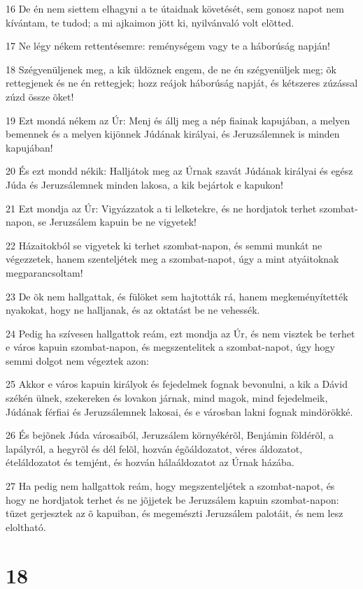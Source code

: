 \par 16 De én nem siettem elhagyni a te útaidnak követését, sem gonosz napot nem kívántam, te tudod; a mi ajkaimon jött ki, nyilvánvaló volt elõtted.
\par 17 Ne légy nékem rettentésemre: reménységem vagy te a háborúság napján!
\par 18 Szégyenüljenek meg, a kik üldöznek engem, de ne én szégyenüljek meg; õk rettegjenek és ne én rettegjek; hozz reájok háborúság napját, és kétszeres zúzással zúzd össze õket!
\par 19 Ezt mondá nékem az Úr: Menj és állj meg a nép fiainak kapujában, a melyen bemennek és a melyen kijönnek Júdának királyai, és Jeruzsálemnek is minden kapujában!
\par 20 És ezt mondd nékik: Halljátok meg az Úrnak szavát Júdának királyai és egész Júda és Jeruzsálemnek minden lakosa, a kik bejártok e kapukon!
\par 21 Ezt mondja az Úr: Vigyázzatok a ti lelketekre, és ne hordjatok terhet szombat-napon, se Jeruzsálem kapuin be ne vigyetek!
\par 22 Házaitokból se vigyetek ki terhet szombat-napon, és semmi munkát ne végezzetek, hanem szenteljétek meg a szombat-napot, úgy a mint atyáitoknak megparancsoltam!
\par 23 De õk nem hallgattak, és fülöket sem hajtották rá, hanem megkeményítették nyakokat, hogy ne halljanak, és az oktatást be ne vehessék.
\par 24 Pedig ha szívesen hallgattok reám, ezt mondja az Úr, és nem visztek be terhet e város kapuin szombat-napon, és megszentelitek a szombat-napot, úgy hogy semmi dolgot nem végeztek azon:
\par 25 Akkor e város kapuin királyok és fejedelmek fognak bevonulni, a kik a Dávid székén ülnek, szekereken és lovakon járnak, mind magok, mind fejedelmeik, Júdának férfiai és Jeruzsálemnek lakosai, és e városban lakni fognak mindörökké.
\par 26 És bejõnek Júda városaiból, Jeruzsálem környékérõl, Benjámin földérõl, a lapályról, a hegyrõl és dél felõl, hozván égõáldozatot, véres áldozatot, ételáldozatot és temjént, és hozván hálaáldozatot az Úrnak házába.
\par 27 Ha pedig nem hallgattok reám, hogy megszenteljétek a szombat-napot, és hogy ne hordjatok terhet és ne jõjjetek be Jeruzsálem kapuin szombat-napon: tüzet gerjesztek az õ kapuiban, és megemészti Jeruzsálem palotáit, és nem lesz eloltható.

\chapter{18}

